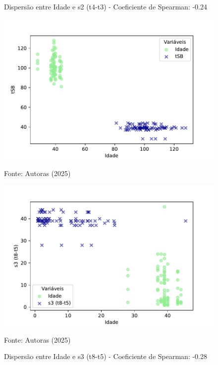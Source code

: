 \begin{figure}[h]
    \captionsetup{font=footnotesize, justification=centering, labelsep=period, position=above}
    \centering
    \begin{minipage}[b]{0.45\linewidth}
        \caption{Dispersão entre Idade e s2 (t4-t3) - Coeficiente de Spearman: -0.24}
        \label{fig:idade-s2}
        \centering
        \includegraphics[scale=0.47]{figuras/Spearman/idade-tSB.pdf}
        \vspace{0.3cm}
        \begin{minipage}{\linewidth}
            \centering
            \scriptsize{Fonte: Autoras (2025)}
        \end{minipage}
    \end{minipage}
    \hspace{0.05\linewidth}
    \begin{minipage}[b]{0.45\linewidth}
        \caption{Dispersão entre Idade e s3 (t8-t5) - Coeficiente de Spearman: -0.28}
        \label{fig:idade-s3}
        \centering
        \includegraphics[scale=0.35]{figuras/Spearman/idade-s3.pdf}
        \vspace{0.3cm}
        \begin{minipage}{\linewidth}
            \centering
            \scriptsize{Fonte: Autoras (2025)}
        \end{minipage}
    \end{minipage}
\end{figure}
\FloatBarrier

